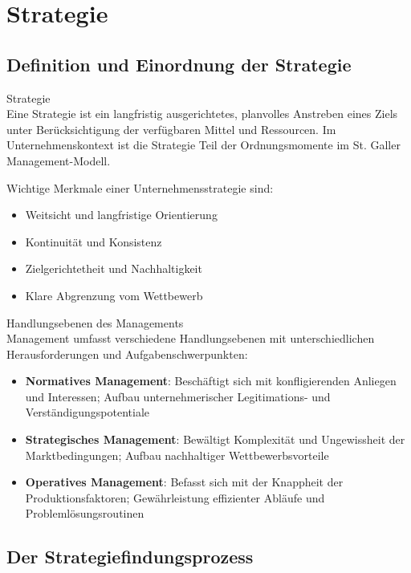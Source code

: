 \section{Strategie}

\subsection{Definition und Einordnung der Strategie}

\begin{definition}{Strategie}\\
Eine Strategie ist ein langfristig ausgerichtetes, planvolles Anstreben eines Ziels unter Berücksichtigung der verfügbaren Mittel und Ressourcen. Im Unternehmenskontext ist die Strategie Teil der Ordnungsmomente im St. Galler Management-Modell.

Wichtige Merkmale einer Unternehmensstrategie sind:
\begin{itemize}
    \item Weitsicht und langfristige Orientierung
    \item Kontinuität und Konsistenz
    \item Zielgerichtetheit und Nachhaltigkeit
    \item Klare Abgrenzung vom Wettbewerb
\end{itemize}
\end{definition}

\begin{concept}{Handlungsebenen des Managements}\\
Management umfasst verschiedene Handlungsebenen mit unterschiedlichen Herausforderungen und Aufgabenschwerpunkten:
\begin{itemize}
    \item \textbf{Normatives Management}: Beschäftigt sich mit konfligierenden Anliegen und Interessen; Aufbau unternehmerischer Legitimations- und Verständigungspotentiale
    \item \textbf{Strategisches Management}: Bewältigt Komplexität und Ungewissheit der Marktbedingungen; Aufbau nachhaltiger Wettbewerbsvorteile
    \item \textbf{Operatives Management}: Befasst sich mit der Knappheit der Produktionsfaktoren; Gewährleistung effizienter Abläufe und Problemlösungsroutinen
\end{itemize}
\end{concept}

\subsection{Der Strategiefindungsprozess}

